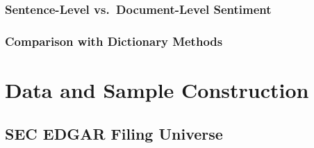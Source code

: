 \documentclass[12pt,a4paper,oneside]{report}
\begin{document}
\subsection{Sentence-Level vs.\ Document-Level Sentiment}
\label{sec:sentence_vs_doc}

\subsection{Comparison with Dictionary Methods}
\label{sec:dict_vs_model_lit}


\chapter{Data and Sample Construction}
\label{ch:data}

\section{SEC EDGAR Filing Universe}
\label{sec:edgar_universe}
\end{document}
